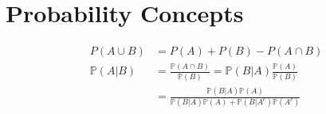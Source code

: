 \section{Probability Concepts}

\begin{align*}
    P(A\cup B)&=P(A) + P(B) - P(A\cap B) \\
    \mathbb{P}(A| B) &= \frac{\mathbb{P}(A \cap B)}{\mathbb{P}(B)} = \mathbb{P}(B| A)\frac{\mathbb{P}(A)}{\mathbb{P}(B)}\\
    &= \frac{\mathbb{P}(B| A)\mathbb{P}(A)}{\mathbb{P}(B| A)\mathbb{P}(A) + \mathbb{P}(B| A^c)\mathbb{P}(A^c)}
\end{align*}